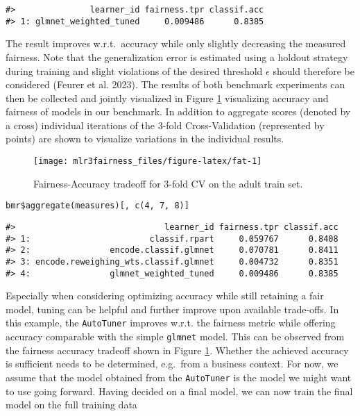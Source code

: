 \begin{verbatim}
#>               learner_id fairness.tpr classif.acc
#> 1: glmnet_weighted_tuned     0.009486      0.8385
\end{verbatim}

The result improves w.r.t.~accuracy while only slightly decreasing the measured fairness.
Note that the generalization error is estimated using a holdout strategy during training and slight violations of the desired threshold \(\epsilon\) should therefore be considered (Feurer et al. 2023).
The results of both benchmark experiments can then be collected and jointly visualized in Figure \ref{fig:fat} visualizing accuracy and fairness of models in our benchmark.
In addition to aggregate scores (denoted by a cross) individual iterations of the 3-fold Cross-Validation (represented by points) are shown to visualize variations in the individual results.

\begin{figure}

{\centering \texttt{[image: mlr3fairness\_files/figure-latex/fat-1]} 

}

\caption{Fairness-Accuracy tradeoff for 3-fold CV on the adult train set.}\label{fig:fat}
\end{figure}

\begin{verbatim}
bmr$aggregate(measures)[, c(4, 7, 8)]
\end{verbatim}

\begin{verbatim}
#>                              learner_id fairness.tpr classif.acc
#> 1:                        classif.rpart     0.059767      0.8408
#> 2:                encode.classif.glmnet     0.070781      0.8411
#> 3: encode.reweighing_wts.classif.glmnet     0.004732      0.8351
#> 4:                glmnet_weighted_tuned     0.009486      0.8385
\end{verbatim}

Especially when considering optimizing accuracy while still retaining a fair model, tuning can be helpful and further improve upon available trade-offs.
In this example, the \texttt{AutoTuner} improves w.r.t. the fairness metric while offering accuracy comparable with the simple \texttt{glmnet} model.
This can be observed from the fairness accuracy tradeoff shown in Figure \ref{fig:fat}.
Whether the achieved accuracy is sufficient needs to be determined, e.g.~from a business context.
For now, we assume that the model obtained from the \texttt{AutoTuner} is the model we might want to use going forward.
Having decided on a final model, we can now train the final model on the full training data

